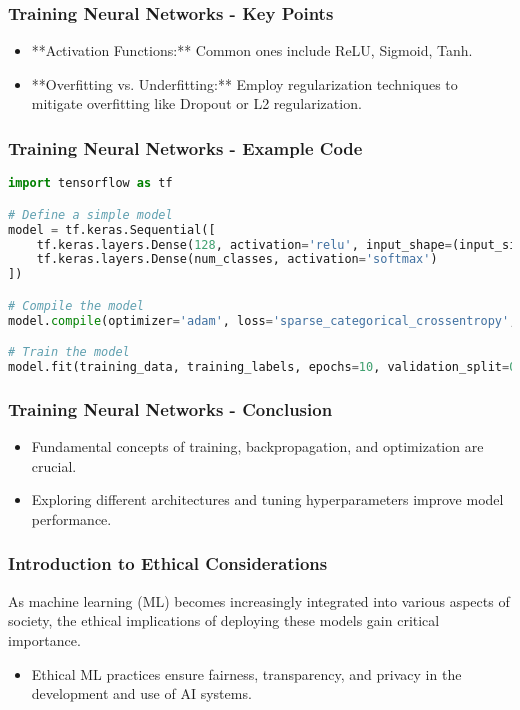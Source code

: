 \documentclass[aspectratio=169]{beamer}
\begin{document}
\begin{frame}[fragile]
    \frametitle{Training Neural Networks - Key Points}
    \begin{itemize}
        \item **Activation Functions:** Common ones include ReLU, Sigmoid, Tanh.
        \item **Overfitting vs. Underfitting:** Employ regularization techniques to mitigate overfitting like Dropout or L2 regularization.
    \end{itemize}
\end{frame}

\begin{frame}[fragile]
    \frametitle{Training Neural Networks - Example Code}
    \begin{lstlisting}[language=Python]
import tensorflow as tf

# Define a simple model
model = tf.keras.Sequential([
    tf.keras.layers.Dense(128, activation='relu', input_shape=(input_size,)),
    tf.keras.layers.Dense(num_classes, activation='softmax')
])

# Compile the model
model.compile(optimizer='adam', loss='sparse_categorical_crossentropy', metrics=['accuracy'])

# Train the model
model.fit(training_data, training_labels, epochs=10, validation_split=0.2)
    \end{lstlisting}
\end{frame}

\begin{frame}[fragile]
    \frametitle{Training Neural Networks - Conclusion}
    \begin{itemize}
        \item Fundamental concepts of training, backpropagation, and optimization are crucial.
        \item Exploring different architectures and tuning hyperparameters improve model performance.
    \end{itemize}
\end{frame}

\begin{frame}[fragile]
    \frametitle{Introduction to Ethical Considerations}
    As machine learning (ML) becomes increasingly integrated into various aspects of society, the ethical implications of deploying these models gain critical importance. 
    \begin{itemize}
        \item Ethical ML practices ensure fairness, transparency, and privacy in the development and use of AI systems.
    \end{itemize}
\end{frame}
\end{document}
